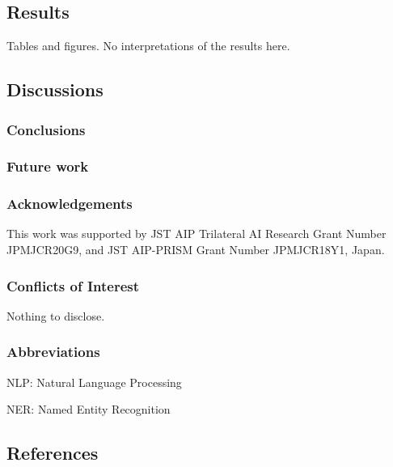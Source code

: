 \documentclass[12pt]{article}
\begin{document}
\subsection{Results}

Tables and figures. No interpretations of the results here.

\subsection{Discussions}

\subsubsection{Conclusions}

\subsubsection{Future work}


\subsubsection{Acknowledgements}  %

This work was supported by JST AIP Trilateral AI Research Grant Number JPMJCR20G9, and JST AIP-PRISM Grant Number JPMJCR18Y1, Japan.


\subsubsection{Conflicts of Interest}
Nothing to disclose.

\subsubsection{Abbreviations}  %

NLP: Natural Language Processing

NER: Named Entity Recognition


\subsection{References}



\end{document}
